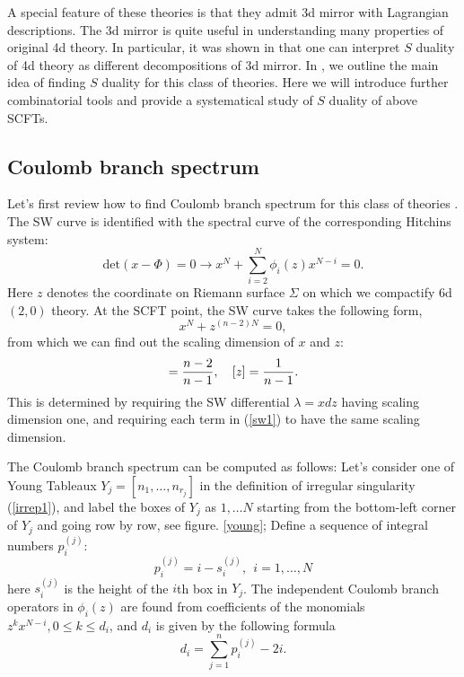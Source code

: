 \documentclass[a4paper,11pt]{article}
\begin{document}
A special feature of these theories is that they admit 3d mirror with Lagrangian descriptions. The 3d mirror is quite useful in
understanding many properties of  original 4d theory. In particular, it was shown in \cite{Xie:2016uqq} that one can interpret $S$ duality of 4d theory as different 
decompositions of 3d mirror. In \cite{Xie:2016uqq}, we outline the main idea of finding $S$ duality  for this class of theories. 
Here we will introduce further combinatorial tools and provide a systematical study of $S$ duality of above SCFTs. 


\subsection{Coulomb branch spectrum}
Let's first review how to find  Coulomb branch spectrum for this class of theories \cite{Xie:2012hs}. 
The SW curve is identified with the spectral curve of the corresponding Hitchins system:
\begin{equation}
\text{det}(x-\Phi)=0\rightarrow x^N+\sum_{i=2}^N \phi_i (z)x^{N-i}=0.
\end{equation}
Here $z$ denotes the coordinate on Riemann surface $\Sigma$ on which we compactify 6d $(2,0)$ theory. 
At the SCFT point, the SW curve takes the following form,
\begin{equation}
x^N+z^{(n-2)N}=0,
\label{sw1}
\end{equation}
from which we can find out the scaling dimension of $x$ and $z$:
\begin{equation}
[x]={n-2\over n-1},~~~[z]={1\over n-1}.
\end{equation}
This is determined by requiring the SW differential $\lambda=xdz$ having scaling dimension one, and requiring each term in 
(\ref{sw1}) to have the same scaling dimension. 

The Coulomb branch spectrum can be computed as follows: Let's consider one of Young Tableaux $Y_j= [n_1, \ldots, n_{r_{j}}]$ in the definition of irregular singularity (\ref{irrep1}), and label the boxes 
of $Y_j$ as $1,\ldots N$ starting from the bottom-left corner of $Y_j$ and going row by row, see figure. \ref{young}; Define a sequence of  integral numbers $p_i^{(j)}$:
\begin{equation}
p_i^{(j)}=i-s_i^{(j)},~~i=1,\ldots, N
\label{seqnum}
\end{equation}
here $s_i^{(j)}$ is the height of the $i$th box in $Y_j$. The independent Coulomb branch operators in $\phi_i(z)$ are found from coefficients of the monomials $ z^{k}x^{N-i}, 0\leq k\leq d_i$, and 
$d_i$ is given by the following formula
\begin{equation}
d_i=\sum_{j=1}^{n}p_i^{(j)}-2i.
\label{spec}
\end{equation}
\end{document}
